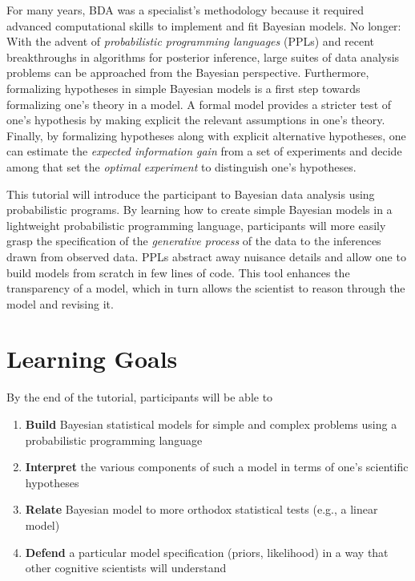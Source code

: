 \documentclass[10pt,letterpaper]{article}
\providecommand{\tightlist}{%
  \setlength{\itemsep}{0pt}\setlength{\parskip}{0pt}}
\begin{document}
For many years, BDA was a specialist's methodology because it required advanced computational skills to implement and fit Bayesian models.
No longer: With the advent of \emph{probabilistic programming languages} (PPLs) and recent breakthroughs in algorithms for posterior inference, large suites of data analysis problems can be approached from the Bayesian perspective. 
Furthermore, formalizing hypotheses in simple Bayesian models is a first step towards formalizing one's theory in a model. 
A formal model provides a stricter test of one's hypothesis by making explicit the relevant assumptions in one's theory. 
Finally, by formalizing hypotheses along with explicit alternative hypotheses, one can estimate the \emph{expected information gain} from a set of experiments and decide among that set the \emph{optimal experiment} to distinguish one's hypotheses. 

This tutorial will introduce the participant to Bayesian data analysis using probabilistic programs. 
By learning how to create simple Bayesian models in a lightweight probabilistic programming language, participants will more easily grasp the specification of the \emph{generative process} of the data to the inferences drawn from observed data.
PPLs abstract away nuisance details and allow one to build models from scratch in few lines of code. 
This tool enhances the transparency of a model, which in turn allows the scientist to reason through the model and revising it. 


\section{Learning Goals}

By the end of the tutorial, participants will be able to 

\begin{enumerate}
\tightlist
\item \textbf{Build} Bayesian statistical models for simple and complex problems using a probabilistic programming language 
\item \textbf{Interpret} the various components of such a model in terms of one's scientific hypotheses 
\item \textbf{Relate} Bayesian model to more orthodox statistical tests (e.g., a linear model) 
\item \textbf{Defend} a particular model specification (priors, likelihood) in a way that other cognitive scientists will understand
\end{enumerate}
\end{document}
